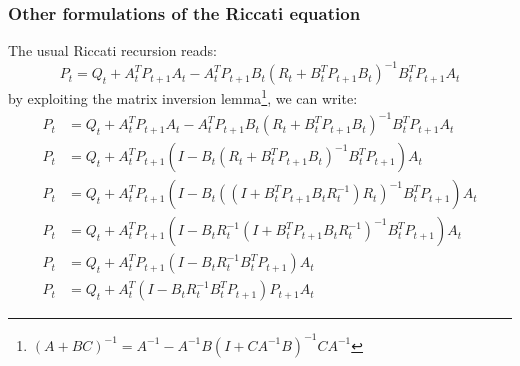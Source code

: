 \documentclass[openany]{book}
\theoremstyle{definition}
\theoremstyle{remark}
\begin{document}
\subsubsection{Other formulations of the Riccati equation}
The usual Riccati recursion reads:
\[
    P_t = Q_t + A_t^TP_{t+1}A_t - A_t^TP_{t+1}B_t(R_t+B_t^TP_{t+1}B_t)^{-1}B_t^TP_{t+1}A_t
\]
by exploiting the matrix inversion lemma\footnote{$(A+BC)^{-1} = A^{-1}-A^{-1}B(I+CA^{-1}B)^{-1}CA^{-1}$}, we can write: 
\begin{align*}
    P_t &= Q_t + A_t^TP_{t+1}A_t - A_t^TP_{t+1}B_t(R_t+B_t^TP_{t+1}B_t)^{-1}B_t^TP_{t+1}A_t\\
    P_t &= Q_t + A_t^TP_{t+1}(I-B_t(R_t+B_t^TP_{t+1}B_t)^{-1}B_t^TP_{t+1})A_t\\
    P_t &= Q_t + A_t^TP_{t+1}(I-B_t((I+B_t^TP_{t+1}B_tR_t^{-1})R_t)^{-1}B_t^TP_{t+1})A_t\\
    P_t &= Q_t + A_t^TP_{t+1}(I-B_tR_t^{-1}(I+B_t^TP_{t+1}B_tR_t^{-1})^{-1}B_t^TP_{t+1})A_t\\
    P_t &= Q_t + A_t^TP_{t+1}(I-B_tR_t^{-1}B_t^TP_{t+1})A_t\\
    P_t &= Q_t + A_t^T(I-B_tR_t^{-1}B_t^TP_{t+1})P_{t+1}A_t
\end{align*}
\end{document}
